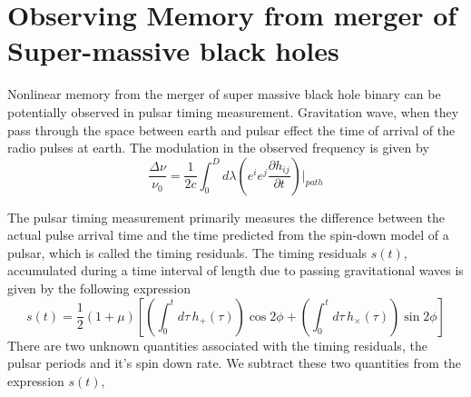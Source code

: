 \documentclass[twocolumn,showpacs,aps,prd,nobibnotes,floatfix]{revtex4-1}
\begin{document}
\section{Observing Memory from merger of Super-massive black holes  }
Nonlinear memory from the merger of super massive black hole binary can be potentially observed in pulsar timing measurement. Gravitation wave, when they pass through the space between earth and pulsar effect the time of arrival of the radio pulses at earth. The modulation in the observed frequency is given by
\begin{equation}
\frac{\Delta \nu}{\nu_{0}} = \frac{1}{2c}\int_{0}^{D}d\lambda \left(e^{i}e^{j}\frac{\partial h_{ij}}{\partial t}\right) \Bigg\vert_{path}
\end{equation}

The pulsar timing measurement primarily measures the difference between the actual pulse arrival time and the time predicted from the spin-down model of a pulsar, which is called the timing residuals. The timing residuals $s(t)$, accumulated during a time interval of length due to passing gravitational waves is given by the following expression 
\begin{equation}
	s(t) = \frac{1}{2}(1+\mu)\left[\left(\int_{0}^{t}d\tau \, h_{+}(\tau)\right)\cos 2\phi + \left(\int_{0}^{t}d\tau \, h_{\times}(\tau)\right)\sin 2\phi\right]
\end{equation}
There are two unknown quantities associated with the timing residuals, the pulsar periods and it's spin down rate. We subtract these two quantities from the expression $s(t)$, 
  
\end{document}
